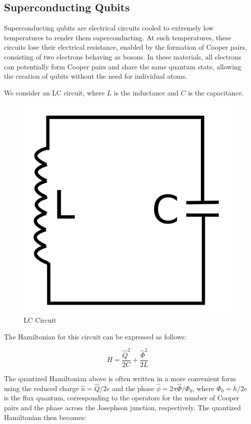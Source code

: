 \documentclass{article}
\begin{document}
\begin{multicols}{2}

\subsection{Superconducting Qubits}

Superconducting qubits are electrical circuits cooled to extremely low temperatures to render them superconducting. 
At such temperatures, these circuits lose their electrical resistance, enabled by the formation of Cooper pairs, consisting of two electrons behaving as bosons. 
In these materials, all electrons can potentially form Cooper pairs and share the same quantum state, allowing the creation of qubits without the need for individual atoms.

We consider an LC circuit, where \(L\) is the inductance and \(C\) is the capacitance.

\begin{figure}[H]
    \centering
    \includegraphics[width = 0.7\columnwidth]{fig/circuit_LC.png}
    \caption{LC Circuit}
    \label{fig:Circuit_LC}
\end{figure}

The Hamiltonian for this circuit can be expressed as follows:

\begin{equation}
H = \frac{{\hat{Q}^2}}{{2C}} + \frac{{\hat{\Phi}^2}}{{2L}}
\end{equation}

The quantized Hamiltonian above is often written in a more convenient form using the reduced charge \(\hat{n} = \hat{Q}/2e\) and the phase \(\hat{\phi} = 2\pi\hat{\Phi}/\Phi_0\), where \(\Phi_0 = h/2e\) is the flux quantum, corresponding to the operators for the number of Cooper pairs and the phase across the Josephson junction, respectively. The quantized Hamiltonian then becomes:


\end{multicols}
\end{document}

